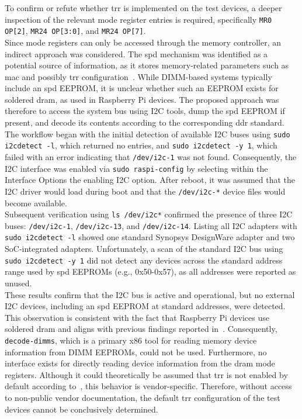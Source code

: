         To confirm or refute whether \gls{trr} is implemented on the test devices, a deeper inspection of the 
        relevant mode register entries is required, specifically \texttt{MR0 OP[2]}, \texttt{MR24 OP[3:0]}, 
        and \texttt{MR24 OP[7]}.
        \\
        Since mode registers can only be accessed through the memory controller, an 
        indirect approach was considered. The \gls{spd} mechanism was identified as a 
        potential source of information, as it stores memory-related parameters such as \gls{mac} and possibly \gls{trr} 
        configuration~\cite{webSPD}. While DIMM-based systems typically include an \gls{spd} EEPROM, it is unclear whether 
        such an EEPROM exists for soldered \gls{dram}, as used in Raspberry Pi devices. The proposed approach was 
        therefore to access the system bus using I2C tools, dump the \gls{spd} EEPROM if present, and decode its 
        contents according to the corresponding \gls{ddr} standard.
        \\
        The workflow began with the initial detection of available I2C buses using \texttt{sudo i2cdetect -l}, 
        which returned no entries, and \texttt{sudo i2cdetect -y 1}, which failed with an error indicating that 
        \texttt{/dev/i2c-1} was not found. Consequently, the I2C interface was enabled via \texttt{sudo raspi-config}
        by selecting within the Interface Options the enabling I2C option. 
        After reboot, it was assumed that the I2C driver would load during boot and that the \texttt{/dev/i2c-*} 
        device files would become available.
        \\
        Subsequent verification using \texttt{ls /dev/i2c*} confirmed the presence of three I2C buses: 
        \texttt{/dev/i2c-1}, \texttt{/dev/i2c-13}, and \texttt{/dev/i2c-14}. Listing all I2C adapters with 
        \texttt{sudo i2cdetect -l} showed one standard Synopsys DesignWare adapter and two SoC-integrated 
        adapters. Unfortunately, a scan of the standard I2C bus using 
        \texttt{sudo i2cdetect -y 1} did not detect any devices across the standard address range used by 
        \gls{spd} EEPROMs (e.g., 0x50-0x57), as all addresses were reported as unused.
        \\
        These results confirm that the I2C bus is active and operational, but no external I2C devices, 
        including an \gls{spd} EEPROM at standard addresses, were detected. This observation is consistent with 
        the fact that Raspberry Pi devices use soldered \gls{dram} and aligns with previous findings reported in~\cite{paperProFlipping}.
        Consequently, \texttt{decode-dimms}, which is a primary x86 tool for reading memory device 
        information from DIMM EEPROMs, could not be used. Furthermore, no interface exists for directly 
        reading device information from the \gls{dram} mode registers. Although it could theoretically be assumed 
        that \gls{trr} is not enabled by default according to~\cite{datasheetLPDDR4}, this behavior is vendor-specific. Therefore, 
        without access to non-public vendor documentation, the default \gls{trr} configuration of the test devices 
        cannot be conclusively determined.

